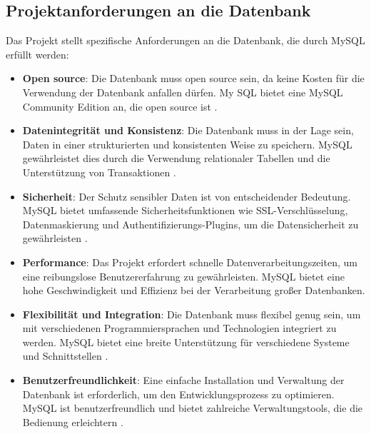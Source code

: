 \subsection{Projektanforderungen an die Datenbank}

Das Projekt stellt spezifische Anforderungen an die Datenbank, die durch MySQL erfüllt werden:

\begin{itemize}
	
	\item \textbf{Open source}: Die Datenbank muss open source sein, da keine Kosten für die Verwendung der Datenbank anfallen dürfen. My SQL bietet eine MySQL Community Edition an, die open source ist \cite{noauthor_mysql_nodate}.
	\item \textbf{Datenintegrität und Konsistenz}: Die Datenbank muss in der Lage sein, Daten in einer strukturierten und konsistenten Weise zu speichern. MySQL gewährleistet dies durch die Verwendung relationaler Tabellen und die Unterstützung von Transaktionen \cite{noauthor_mysql_nodate} .
	\item \textbf{Sicherheit}: Der Schutz sensibler Daten ist von entscheidender Bedeutung. MySQL bietet umfassende Sicherheitsfunktionen wie SSL-Verschlüsselung, Datenmaskierung und Authentifizierungs-Plugins, um die Datensicherheit zu gewährleisten \cite{noauthor_mysql_nodate} .
	\item \textbf{Performance}: Das Projekt erfordert schnelle Datenverarbeitungszeiten, um eine reibungslose Benutzererfahrung zu gewährleisten. MySQL bietet eine hohe Geschwindigkeit und Effizienz bei der Verarbeitung großer Datenbanken\cite{noauthor_was_2022}.
	\item \textbf{Flexibilität und Integration}: Die Datenbank muss flexibel genug sein, um mit verschiedenen Programmiersprachen und Technologien integriert zu werden. MySQL bietet eine breite Unterstützung für verschiedene Systeme und Schnittstellen \cite{noauthor_was_2022}.
	\item \textbf{Benutzerfreundlichkeit}: Eine einfache Installation und Verwaltung der Datenbank ist erforderlich, um den Entwicklungsprozess zu optimieren. MySQL ist benutzerfreundlich und bietet zahlreiche Verwaltungstools, die die Bedienung erleichtern \cite{noauthor_was_2022}.
\end{itemize}

